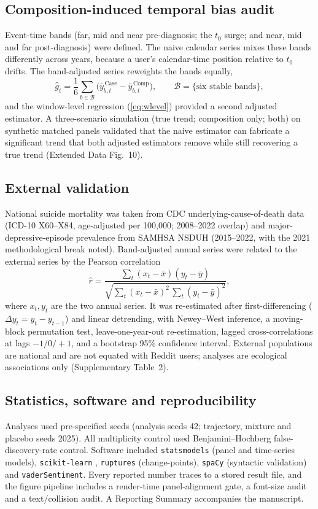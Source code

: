 \documentclass[11pt]{article}
\newcommand{\suptab}[1]{Supplementary Table~#1}
\newcommand{\edfig}[1]{Extended Data Fig.~#1}
\begin{document}
\subsection*{Composition-induced temporal bias audit}
Event-time bands (far, mid and near pre-diagnosis; the $t_0$ surge; and near, mid and far
post-diagnosis) were defined. The naive calendar series mixes these bands differently across
years, because a user's calendar-time position relative to $t_0$ drifts. The band-adjusted
series reweights the bands equally,
\begin{equation}
\widehat{g}_t=\frac{1}{6}\sum_{b\in\mathcal{B}}\bigl(\bar y^{\,\mathrm{Case}}_{b,t}-\bar y^{\,\mathrm{Comp}}_{b,t}\bigr),
\qquad \mathcal{B}=\{\text{six stable bands}\},
\label{eq:bandadjust}
\end{equation}
and the window-level regression (\ref{eq:wlevel}) provided a second adjusted estimator. A
three-scenario simulation (true trend; composition only; both) on synthetic matched panels
validated that the naive estimator can fabricate a significant trend that both adjusted
estimators remove while still recovering a true trend (\edfig{10}).

\subsection*{External validation}
National suicide mortality was taken from CDC underlying-cause-of-death data (ICD-10 X60--X84,
age-adjusted per 100{,}000; 2008--2022 overlap) and major-depressive-episode prevalence from
SAMHSA NSDUH (2015--2022, with the 2021 methodological break noted). Band-adjusted annual
series were related to the external series by the Pearson correlation
\begin{equation}
\hat r=\frac{\sum_t (x_t-\bar x)(y_t-\bar y)}{\sqrt{\sum_t (x_t-\bar x)^2\,\sum_t (y_t-\bar y)^2}},
\label{eq:pearson}
\end{equation}
where $x_t,y_t$ are the two annual series. It was re-estimated after first-differencing ($\Delta y_t=y_t-y_{t-1}$) and linear detrending, with
Newey--West inference, a moving-block permutation test, leave-one-year-out re-estimation, lagged
cross-correlations at lags $-1/0/+1$, and a bootstrap 95\% confidence interval. External
populations are national and are not equated with Reddit users; analyses are ecological
associations only (\suptab{2}).

\subsection*{Statistics, software and reproducibility}
Analyses used pre-specified seeds (analysis seeds 42; trajectory, mixture and placebo seeds
2025). All multiplicity control used Benjamini--Hochberg false-discovery-rate control. Software
included \texttt{statsmodels} (panel and time-series models), \texttt{scikit-learn}
\cite{pedregosa2011scikit}, \texttt{ruptures} (change-points), \texttt{spaCy} (syntactic
validation) and \texttt{vaderSentiment}. Every reported number traces to a stored result file,
and the figure pipeline includes a render-time panel-alignment gate, a font-size audit and a
text/collision audit. A Reporting Summary accompanies the manuscript.
\end{document}
